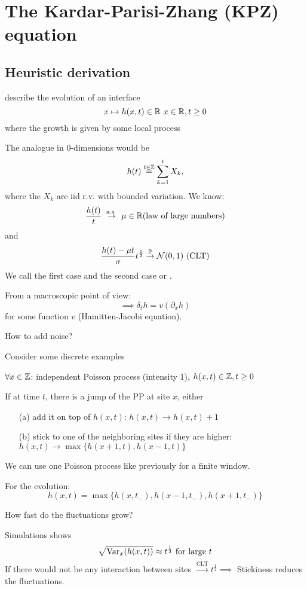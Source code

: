 \chapter{The Kardar-Parisi-Zhang (KPZ) equation}

\section{Heuristic derivation}

 describe the evolution of an interface \[x\mapsto h(x,t)\in\mathbb{R}\ x\in\mathbb{R},t\geq 0\] where the growth is given by some local process

The analogue in $0$-dimensions would be \[h(t)\stackrel{t\in\mathbb{Z}}{=}\sum_{k=1}^t X_k,\] where the $X_k$ are iid r.v. with bounded variation. We know: 
\[\frac{h(t)}{t}\stackrel{\text{ a.s. }}{\to}\mu\in\mathbb{R} (\text{law of large numbers})\] and 
\[\frac{h(t)-\mu t}{\sigma}t^{\frac{1}{2}}\stackrel{\mathbb{P}}{\to}\mathcal{N}(0,1)\text{ (CLT)}\]
We call the first case  and the second case  or .

From a macroscopic point of view:
\[\implies \delta_t h =v(\partial_x h)\] for some function $v$ (Hamitten-Jacobi equation).

 How to add noise?

Consider some discrete examples

 $\forall x\in\mathbb{Z}$: independent Poisson process (intensity 1), $h(x,t)\in \mathbb{Z},t\geq 0$

If at time $t$, there is a jump of the PP at site $x$, either 
\begin{enumerate}
    \item[(a)] add it on top of $h(x,t)$: $h(x,t)\to h(x,t)+1$
    \item[(b)] stick to one of the neighboring sites if they are higher: $h(x,t)\to\max\{h(x+1,t),h(x-1,t)\}$
    
\end{enumerate}We can use one Poisson process like previously for a finite window.

For the evolution:\[h(x,t)=\max\{h(x,t_-),h(x-1,t_-),h(x+1,t_-)\}\]

 How fast do the fluctuations grow?

Simulations shows 
\[\sqrt{\text{Var}_x(h(x,t))}\approx t^{\frac{1}{3}}\text{ for large }t\]
If there would not be any interaction between sites $\stackrel{\text{CLT}}{\to}t^{\frac{1}{2}}\implies$ Stickiness reduces the fluctuations.

